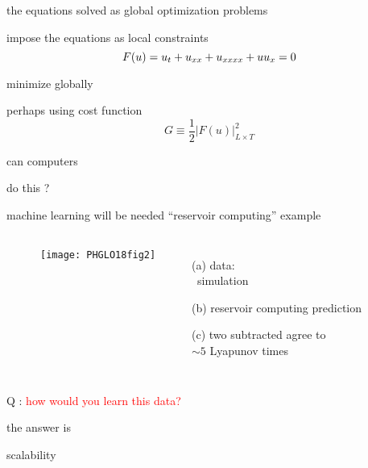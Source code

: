 \begin{frame}{the equations solved as global optimization problems}
\begin{block}{impose the equations as local constraints}
\[
F(u) = u_t + u_{x x} + u_{x x x x} + u u_{x} = 0
\]
\end{block}
\bigskip\bigskip
minimize globally
\begin{block}{perhaps using cost function}
\[
G \equiv \frac{1}{2} |F(u)|^2_{L \times T}
\]
\end{block}
\end{frame}

\begin{frame}{can computers}

\vfill

{\Huge
do this ?
                  }

\vfill

\end{frame}

\begin{frame}{machine learning will be needed}
``reservoir computing'' example

\bigskip

 \begin{columns}
~~~~~~\texttt{[image: PHGLO18fig2]}
 \begin{itemize}
 \item[(a)] data: \\ \KS\ simulation
 \item[(b)] reservoir computing prediction
 \item[(c)] two subtracted agree to \\
            $\sim 5$ Lyapunov times
 \end{itemize}
 \end{columns}
\vfill {\Large Q : \textcolor{red}{how would you learn this data?}}
\end{frame}

\begin{frame}{the answer is}

\vfill

{\Huge
scalability
                  }

\vfill

\end{frame}

